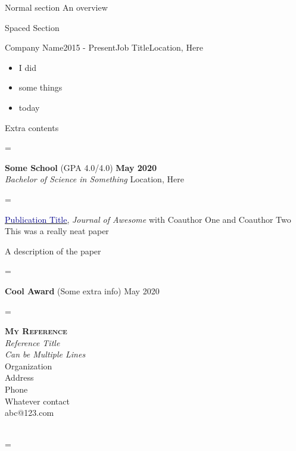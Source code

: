 \documentclass[11pt]{resume}
\newenvironment{absolutelynopagebreak}{\par\nobreak\vfil\penalty0\vfilneg\vtop\bgroup}{\par\xdef\tpd{\the\prevdepth}\egroup\prevdepth=\tpd}
\begin{document}
\begin{section}{Normal section}
An overview
\end{section}
\begin{section}{Spaced Section}
\vspace{0.2cm}
\begin{absolutelynopagebreak}
\begin{employment}{Company Name}{2015 - Present}{Job Title}{Location, Here}
\item \begin{itemize}
\item I did
\item some things
\item today
\end{itemize}
Extra contents
\end{employment}
\end{absolutelynopagebreak}

\begin{absolutelynopagebreak}
\textbf{Some School}
 (GPA 4.0/4.0)
\hfill
\textbf{May 2020}
\\
\textit{Bachelor of Science in Something}
\hfill
Location, Here
\\[-8pt]
\end{absolutelynopagebreak}

\begin{absolutelynopagebreak}
\hangindent=1cm
\href{https://www.example.com/}{\underline{\textcolor{darkblue}{Publication Title}}},
\textit{Journal of Awesome}
 with 
Coauthor One
 and 
Coauthor Two
This was a really neat paper

\justifying
A description of the paper
\vspace{0.2cm}
\vspace{0.2cm}
\end{absolutelynopagebreak}

\begin{absolutelynopagebreak}
\textbf{Cool Award}
 (Some extra info)
\hfill
May 2020
\\[-8pt]
\end{absolutelynopagebreak}

\begin{absolutelynopagebreak}
\textsc{\textbf{My Reference}}
\\
\textit{Reference Title}
\\
\textit{Can be Multiple Lines}
\\
Organization
\\
Address
\\
Phone
\\
Whatever contact
\\
abc@123.com
\\
\\[-8pt]
\end{absolutelynopagebreak}
\vspace{-0.2cm}
\end{section}
\end{document}
